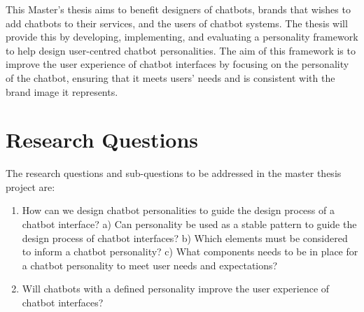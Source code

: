 This Master's thesis aims to benefit designers of chatbots, brands that wishes to add chatbots to their services, and the users of chatbot systems. The thesis will provide this by developing, implementing, and evaluating a personality framework to help design user-centred chatbot personalities. The aim of this framework is to improve the user experience of chatbot interfaces by focusing on the personality of the chatbot, ensuring that it meets users' needs and is consistent with the brand image it represents.


\vspace{5mm} %

\section{Research Questions}

The research questions and sub-questions to be addressed in the master thesis project are:

\begin{enumerate}
    \item How can we design chatbot personalities to guide the design process of a chatbot interface? 
        \subitem a) Can personality be used as a stable pattern to guide the design \subitem    process of chatbot interfaces?
        \subitem b) Which elements must be considered to inform a chatbot personality?
        \subitem c) What components needs to be in place for a chatbot personality to \subitem  meet user needs and expectations?
    \item Will chatbots with a defined personality improve the user experience of chatbot interfaces?
\end{enumerate}

\vspace{5mm} %

